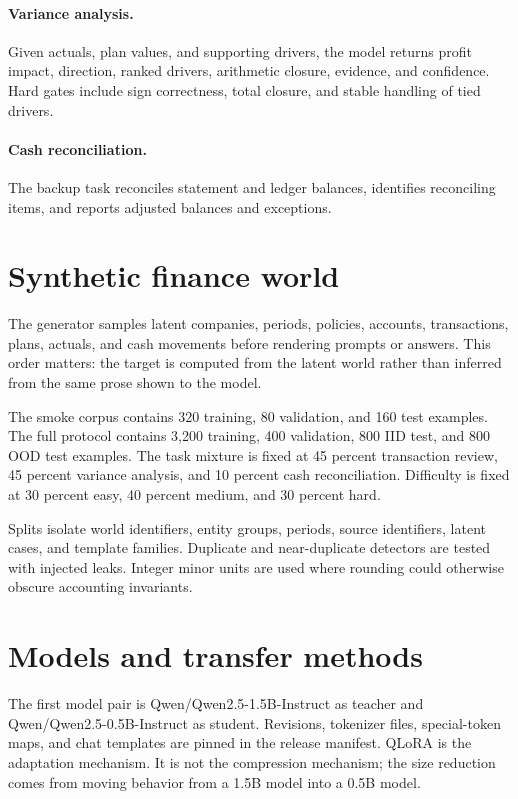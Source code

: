 \documentclass{article}
\begin{document}
\paragraph{Variance analysis.} Given actuals, plan values, and supporting drivers, the model returns profit impact, direction, ranked drivers, arithmetic closure, evidence, and confidence. Hard gates include sign correctness, total closure, and stable handling of tied drivers.

\paragraph{Cash reconciliation.} The backup task reconciles statement and ledger balances, identifies reconciling items, and reports adjusted balances and exceptions.

\section{Synthetic finance world}
The generator samples latent companies, periods, policies, accounts, transactions, plans, actuals, and cash movements before rendering prompts or answers. This order matters: the target is computed from the latent world rather than inferred from the same prose shown to the model.

The smoke corpus contains 320 training, 80 validation, and 160 test examples. The full protocol contains 3,200 training, 400 validation, 800 IID test, and 800 OOD test examples. The task mixture is fixed at 45 percent transaction review, 45 percent variance analysis, and 10 percent cash reconciliation. Difficulty is fixed at 30 percent easy, 40 percent medium, and 30 percent hard.

Splits isolate world identifiers, entity groups, periods, source identifiers, latent cases, and template families. Duplicate and near-duplicate detectors are tested with injected leaks. Integer minor units are used where rounding could otherwise obscure accounting invariants.

\section{Models and transfer methods}
The first model pair is Qwen/Qwen2.5-1.5B-Instruct as teacher and Qwen/Qwen2.5-0.5B-Instruct as student. Revisions, tokenizer files, special-token maps, and chat templates are pinned in the release manifest. QLoRA is the adaptation mechanism. It is not the compression mechanism; the size reduction comes from moving behavior from a 1.5B model into a 0.5B model.
\end{document}

